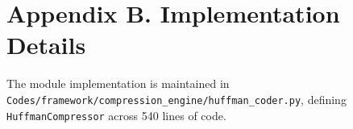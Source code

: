 \section*{Appendix B. Implementation Details}
The module implementation is maintained in \texttt{Codes/framework/compression\_engine/huffman\_coder.py}, defining \texttt{HuffmanCompressor} across 540 lines of code.
